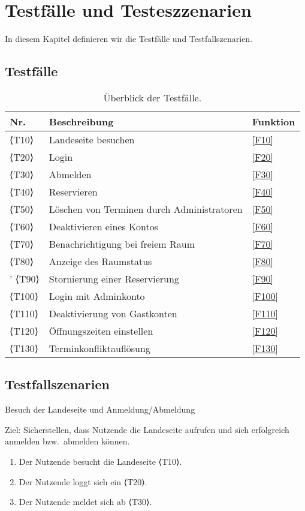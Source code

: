 \chapter{Testfälle und Testeszzenarien}
\label{chap:test}
In diesem Kapitel definieren wir die Testfälle und Testfallszenarien.

\section{Testfälle}

\begin{table}[htbp]
  \centering
  \begin{tabularx}{\textwidth}{ l|X|l }
      \textbf{Nr.} & \textbf{Beschreibung} & \textbf{Funktion} \\ \hline\hline
      ⟨T10⟩ & Landeseite besuchen &\ref{F10}\\
      ⟨T20⟩ & Login &\ref{F20} \\
      ⟨T30⟩ & Abmelden &\ref{F30} \\
      ⟨T40⟩ & Reservieren &\ref{F40} \\
      ⟨T50⟩ & Löschen von Terminen durch Administratoren &\ref{F50} \\
      ⟨T60⟩ & Deaktivieren eines Kontos &\ref{F60} \\
      ⟨T70⟩ & Benachrichtigung bei freiem Raum &\ref{F70} \\
      ⟨T80⟩ & Anzeige des Raumstatus &\ref{F80} \\'
      ⟨T90⟩ & Stornierung einer Reservierung &\ref{F90} \\
      ⟨T100⟩ & Login mit Adminkonto &\ref{F100} \\
      ⟨T110⟩ & Deaktivierung von Gastkonten &\ref{F110} \\
      ⟨T120⟩ & Öffnungszeiten einstellen &\ref{F120} \\
      ⟨T130⟩ & Terminkonfliktauflösung &\ref{F130} \\
  \end{tabularx}
  \caption{Überblick der Testfälle.}
  \label{tab:test_table}
\end{table}

\pagebreak

\section{Testfallszenarien}\label{sec:testfallszenarien}
\begin{scenario}{10}{Besuch der Landeseite und Anmeldung/Abmeldung}
  \item[Ziel:] Sicherstellen, dass Nutzende die Landeseite aufrufen und sich erfolgreich anmelden bzw.\ abmelden können.
  \begin{enumerate}
    \item Der Nutzende besucht die Landeseite ⟨T10⟩.
    \item Der Nutzende loggt sich ein ⟨T20⟩.
    \item Der Nutzende meldet sich ab ⟨T30⟩.
  \end{enumerate}
\end{scenario}

